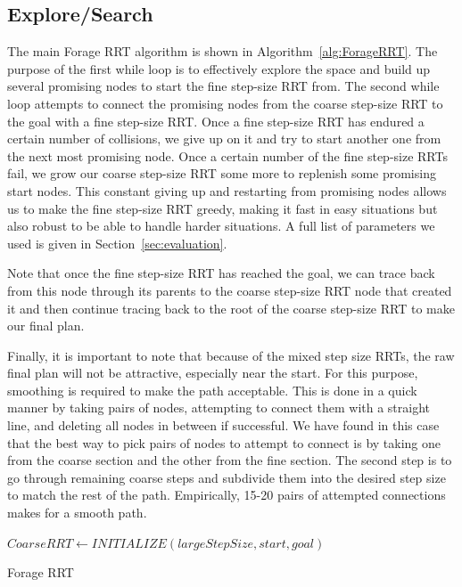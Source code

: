 \documentclass[conference]{IEEEtran}
\begin{document}
\subsection{Explore/Search}
The main Forage RRT algorithm is shown in Algorithm~\ref{alg:ForageRRT}. The purpose of the first while loop is to effectively explore the
space and build up several promising nodes to start the fine step-size RRT from. The second while loop attempts to connect the promising
nodes from the coarse step-size RRT to the goal with a fine step-size RRT. Once a fine step-size RRT has endured a certain number of
collisions, we give up on it and try to start another one from the next most promising node. Once a certain number of the fine step-size
RRTs fail, we grow our coarse step-size RRT some more to replenish some promising start nodes. This constant giving up and restarting from
promising nodes allows us to make the fine step-size RRT greedy, making it fast in easy situations but also robust to be able to handle
harder situations. A full list of parameters we used is given in Section~\ref{sec:evaluation}.

Note that once the fine step-size RRT has reached the goal, we can trace back from this node through its parents to the coarse step-size RRT
node that created it and then continue tracing back to the root of the coarse step-size RRT to make our final plan. 

Finally, it is important to note that because of the mixed step size RRTs, the raw final plan will not be attractive, especially near the
start. For this purpose, smoothing is required to make the path acceptable. This is done in a quick manner by taking pairs of nodes,
attempting to connect them with a straight line, and deleting all nodes in between if successful. We have found in this case that the
best way to pick pairs of nodes to attempt to connect is by taking one from the coarse section and the other from the fine section.  The
second step is to go through remaining coarse steps and subdivide them into the desired step size to match the rest of the path.
Empirically, 15-20 pairs of attempted connections makes for a smooth path. 

\begin{algorithm}
 \label{alg:ForageRRT}
 \SetAlgoLined
	$CoarseRRT \leftarrow INITIALIZE(largeStepSize, start, goal)$\;
\caption{Forage RRT}
\end{algorithm}
\end{document}
